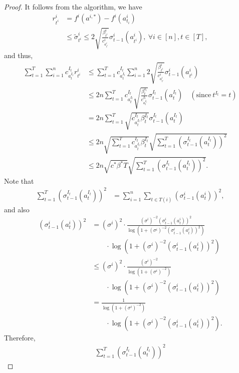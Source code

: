 \documentclass[letterpaper]{vldb}
\begin{document}
\begin{proof}
  It follows from the algorithm, we have
  \begin{align*}
    r^i_{t^i} & = f^i(a^{i,\ast}) - f^i(a^i_{t_i})\\
    & \le \tilde{\sigma}^i_{t^i} \le 2
    \sqrt{\frac{\beta^i_{t^i}}{c^i_{a^i_{t^i}}}}\sigma^i_{t-1}(a^i_{t^i}),\ \forall
    i\in [n], t\in [T],
  \end{align*}
  and thus,
  \begin{align*}
    \sum_{t=1}^T \sum_{i=1}^n c^{I_t}_{a^{I_t}_t} r^i_{t^i}
    & \le \sum_{t=1}^T c^{I_t}_{a^{I_t}_t} \sum_{i=1}^n  2 \sqrt{\frac{\beta^i_{t^i}}{c^i_{a^i_{t^i}}}}\sigma^i_{t-1}(a^i_{t^i})\\
        & \le 2n  \sum_{t=1}^T c^{I_t}_{a^{I_t}_t} \sqrt{\frac{\beta^{I_t}_{t}}{c^{I_t}_{a^{I_t}_{t}}}} \sigma^{I_t}_{t-1}(a^{I_t}_t) \quad(\text{since}~t^{I_t}=t)\\
    & = 2 n \sum_{t=1}^T \sqrt{c^{I_t}_{a^{I_t}_{t}}\beta^{I_t}_{t}} \sigma^{I_t}_{t-1}(a^{I_t}_t) \\
    & \le 2n \sqrt{\sum_{t=1}^Tc^{I_t}_{a^{I_t}_{t}}\beta^{I_t}_{t}}\sqrt{\sum_{t=1}^T (\sigma^{I_t}_{t-1}(a^{I_t}_t))^2}\\
    & \le 2n \sqrt{c^\ast\beta^\ast T}\sqrt{\sum_{t=1}^T (\sigma^{I_t}_{t-1}(a^{I_t}_t))^2}.
  \end{align*}
  Note that
  \begin{align*}
    \sum_{t=1}^T (\sigma^{I_t}_{t-1}(a^{I_t}_t))^2
    & = \sum_{i=1}^n \sum_{t\in T(i)} (\sigma^i_{t-1}(a^i_{t}))^2,
  \end{align*}
  and also
  \begin{align*}
    (\sigma^i_{t-1}(a^i_{t}))^2
    & = (\sigma^i)^2\cdot \frac{(\sigma^i)^{-2} (\sigma^i_{t-1}(a^i_{t}))^2}{\log\left(1 + (\sigma^i)^{-2} (\sigma^i_{t-1}(a^i_{t}))^2\right)}\\
    &\qquad \cdot \log\left(1 + (\sigma^i)^{-2} (\sigma^i_{t-1}(a^i_{t}))^2\right)\\
    & \le (\sigma^i)^2 \cdot \frac{(\sigma^i)^{-2}}{\log\left(1 + (\sigma^i)^{-2}\right)}\\
    &\qquad \cdot \log\left(1 + (\sigma^i)^{-2} (\sigma^i_{t-1}(a^i_{t}))^2\right)\\
    & = \frac{1}{\log\left(1 + (\sigma^i)^{-2}\right)}\\   
    &\qquad \cdot \log\left(1 + (\sigma^i)^{-2} (\sigma^i_{t-1}(a^i_{t}))^2\right).
  \end{align*}
  Therefore,
  \begin{align*}
    \sum_{t=1}^T (\sigma^{I_t}_{t-1}(a^{I_t}_t))^2

\end{align*}
\end{proof}
\end{document}
